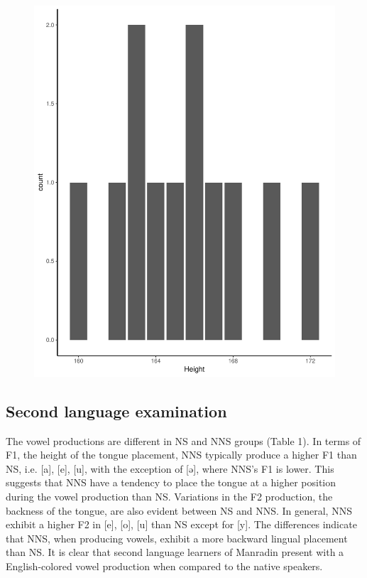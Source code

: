 \documentclass[man, fleqn, noextraspace]{apa6}
\begin{document}
\begin{figure}
\centering
\includegraphics{Vowel_v3_files/figure-latex/figure5-1.pdf}
\caption{}
\end{figure}

\subsection{Second language
examination}\label{second-language-examination}

The vowel productions are different in NS and NNS groups (Table 1). In
terms of F1, the height of the tongue placement, NNS typically produce a
higher F1 than NS, i.e. {[}a{]}, {[}e{]}, {[}u{]}, with the exception of
{[}ə{]}, where NNS's F1 is lower. This suggests that NNS have a tendency
to place the tongue at a higher position during the vowel production
than NS. Variations in the F2 production, the backness of the tongue,
are also evident between NS and NNS. In general, NNS exhibit a higher F2
in {[}e{]}, {[}o{]}, {[}u{]} than NS except for {[}y{]}. The differences
indicate that NNS, when producing vowels, exhibit a more backward
lingual placement than NS. It is clear that second language learners of
Manradin present with a English-colored vowel production when compared
to the native speakers.
\end{document}
